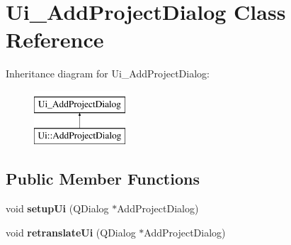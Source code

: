 \hypertarget{classUi__AddProjectDialog}{\section{Ui\-\_\-\-Add\-Project\-Dialog Class Reference}
\label{classUi__AddProjectDialog}
}
Inheritance diagram for Ui\-\_\-\-Add\-Project\-Dialog\-:\begin{figure}[H]
\begin{center}
\leavevmode
\includegraphics[height=2.000000cm]{d5/dda/classUi__AddProjectDialog}
\end{center}
\end{figure}
\subsection*{Public Member Functions}
\begin{DoxyCompactItemize}
\item 
\hypertarget{classUi__AddProjectDialog_ab220cb4ba50a4fe04bc8e500a7edffd6}{void {\bfseries setup\-Ui} (Q\-Dialog $\ast$Add\-Project\-Dialog)}\label{classUi__AddProjectDialog_ab220cb4ba50a4fe04bc8e500a7edffd6}

\item 
\hypertarget{classUi__AddProjectDialog_ac41ef7910ebca8c7b6b35e8352abd5eb}{void {\bfseries retranslate\-Ui} (Q\-Dialog $\ast$Add\-Project\-Dialog)}\label{classUi__AddProjectDialog_ac41ef7910ebca8c7b6b35e8352abd5eb}

\end{DoxyCompactItemize}

